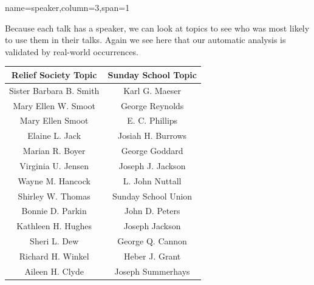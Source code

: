 \documentclass[landscape,final]{baposter}
\begin{document}
\begin{poster}
  {name=speaker,column=3,span=1}{

	Because each talk has a speaker, we can look at topics to see who was most
	likely to use them in their talks.  Again we see here that our automatic
	analysis is validated by real-world occurrences.

	\begin{center}
	  \begin{tabular}{cc}
		Relief Society Topic&Sunday School Topic\\
		\hline
		Sister Barbara B. Smith&Karl G. Maeser \\
		Mary Ellen W. Smoot&George Reynolds \\
		Mary Ellen Smoot&E. C. Phillips \\
		Elaine L. Jack&Josiah H. Burrows \\
		Marian R. Boyer&George Goddard \\
		Virginia U. Jensen&Joseph J. Jackson\\
		Wayne M. Hancock&L. John Nuttall \\
		Shirley W. Thomas&Sunday School Union \\
		Bonnie D. Parkin&John D. Peters \\
		Kathleen H. Hughes&Joseph Jackson \\
		Sheri L. Dew&George Q. Cannon \\
		Richard H. Winkel&Heber J. Grant \\
		Aileen H. Clyde&Joseph Summerhays \\
	  \end{tabular}
	\end{center}

  }

\end{poster}
\end{document}
